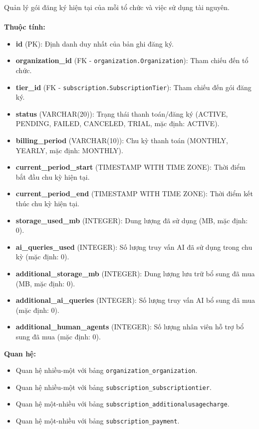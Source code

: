  Quản lý gói đăng ký hiện tại của mỗi tổ chức và việc sử dụng tài nguyên. \\\\
\indent\textbf{Thuộc tính:}
\begin{itemize}
    \item \textbf{id} (PK): Định danh duy nhất của bản ghi đăng ký.
    \item \textbf{organization\_id} (FK - \texttt{organization.Organization}): Tham chiếu đến tổ chức.
    \item \textbf{tier\_id} (FK - \texttt{subscription.SubscriptionTier}): Tham chiếu đến gói đăng ký.
    \item \textbf{status} (VARCHAR(20)): Trạng thái thanh toán/đăng ký (ACTIVE, PENDING, FAILED, CANCELED, TRIAL, mặc định: ACTIVE).
    \item \textbf{billing\_period} (VARCHAR(10)): Chu kỳ thanh toán (MONTHLY, YEARLY, mặc định: MONTHLY).
    \item \textbf{current\_period\_start} (TIMESTAMP WITH TIME ZONE): Thời điểm bắt đầu chu kỳ hiện tại.
    \item \textbf{current\_period\_end} (TIMESTAMP WITH TIME ZONE): Thời điểm kết thúc chu kỳ hiện tại.
    \item \textbf{storage\_used\_mb} (INTEGER): Dung lượng đã sử dụng (MB, mặc định: 0).
    \item \textbf{ai\_queries\_used} (INTEGER): Số lượng truy vấn AI đã sử dụng trong chu kỳ (mặc định: 0).
    \item \textbf{additional\_storage\_mb} (INTEGER): Dung lượng lưu trữ bổ sung đã mua (MB, mặc định: 0).
    \item \textbf{additional\_ai\_queries} (INTEGER): Số lượng truy vấn AI bổ sung đã mua (mặc định: 0).
    \item \textbf{additional\_human\_agents} (INTEGER): Số lượng nhân viên hỗ trợ bổ sung đã mua (mặc định: 0).
\end{itemize}
\textbf{Quan hệ:}
\begin{itemize}
    \item Quan hệ nhiều-một với bảng \texttt{organization\_organization}.
    \item Quan hệ nhiều-một với bảng \texttt{subscription\_subscriptiontier}.
    \item Quan hệ một-nhiều với bảng \texttt{subscription\_additionalusagecharge}.
    \item Quan hệ một-nhiều với bảng \texttt{subscription\_payment}.
\end{itemize}

